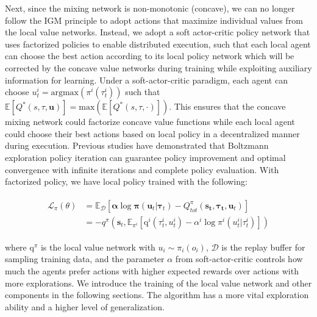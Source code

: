 {Next, since the mixing network is non-monotonic (concave), we can no longer follow the IGM principle to adopt actions that maximize individual values from the local value networks. Instead, we adopt a soft actor-critic policy network that uses factorized policies to enable distributed execution, such that each local agent can choose the best action according to its local policy network which will be corrected by the concave value networks during training while exploiting auxiliary information for learning.  Under a soft-actor-critic paradigm, each agent can choose $u^i_t = \text{argmax} (\pi^i(\tau^i_t))$ such that  $\mathbb{E}[Q^*(s, \tau, \textbf{u})] = \text{max}(\mathbb{E}[Q^*(s, \tau, \cdot)])$. This ensures that the concave mixing network could factorize concave value functions while each local agent could choose their best actions based on local policy in a decentralized manner during execution. Previous studies have demonstrated that Boltzmann exploration policy iteration can guarantee policy improvement and optimal convergence with infinite iterations and complete policy evaluation. With factorized policy, we have local policy trained with the following: 
\begin{small}
\begin{equation}
\begin{array}{l}
\begin{aligned}
\mathcal{L}_{\pi}(\theta) &=\mathbb{E}_{\mathcal{D}}\left[\boldsymbol\alpha \log \boldsymbol{\pi}\left(\boldsymbol{u}_{t} | \boldsymbol{\tau}_{t}\right)-Q^{\pi}_{tot}\left(\boldsymbol{s_{t}}, \boldsymbol{\tau_{t}}, \boldsymbol{u}_{t}\right)\right] \\
&= -q^{\pi}\left(\boldsymbol{s}_{t}, \mathbb{E}_{\pi^{i}}\left[\text{q}^{i}\left(\tau_{t}^{i}, u_{t}^{i}\right)-\alpha^{i} \log \pi^{i}\left(u_{t}^{i} | \tau_{t}^{i}\right)\right]\right)
\end{aligned}
\end{array}
\end{equation}
\end{small}
where $\text{q}^{\pi}$ is the local value network with $u_i \sim \pi_i(o_i)$, $\mathcal{D}$ is the replay buffer for sampling training data, and the parameter $\alpha$ from soft-actor-critic controls how much the agents prefer actions with higher expected rewards over actions with more explorations. We introduce the training of the local value network and other components in the following sections. The algorithm has a more vital exploration ability and a higher level of generalization. 




}
